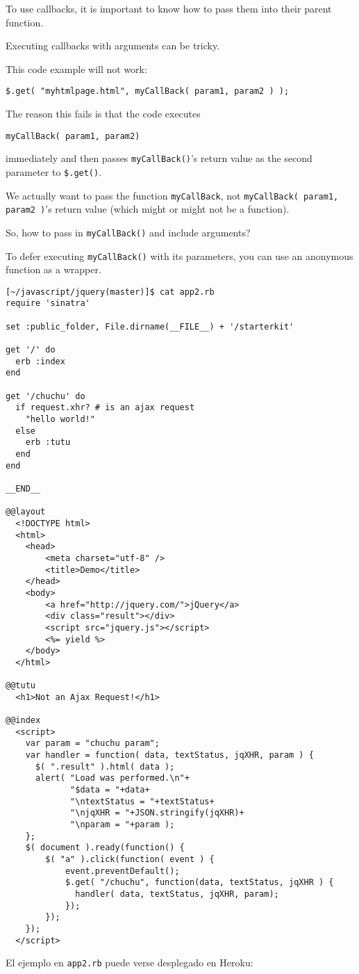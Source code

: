 To use callbacks, it is important to know how to pass them into their parent function.


Executing callbacks with arguments can be tricky.

This code example will not work:

\begin{verbatim}
$.get( "myhtmlpage.html", myCallBack( param1, param2 ) );
\end{verbatim}
The reason this fails is that the code executes 

\begin{verbatim}
myCallBack( param1, param2) 
\end{verbatim}

immediately and then passes \verb|myCallBack()|'s return value as the second
parameter to \verb|$.get()|. 

We actually want to pass the function \verb|myCallBack|,
not \verb|myCallBack( param1, param2 )|'s return value (which might or might not
be a function). 

So, how to pass in \verb|myCallBack()| and include arguments?

To defer executing \verb|myCallBack()| with its parameters, you can use
an anonymous function as a wrapper.


\begin{verbatim}
[~/javascript/jquery(master)]$ cat app2.rb
require 'sinatra'

set :public_folder, File.dirname(__FILE__) + '/starterkit'

get '/' do
  erb :index
end

get '/chuchu' do
  if request.xhr? # is an ajax request
    "hello world!"
  else 
    erb :tutu
  end
end

__END__

@@layout
  <!DOCTYPE html>
  <html>
    <head>
        <meta charset="utf-8" />
        <title>Demo</title>
    </head>
    <body>
        <a href="http://jquery.com/">jQuery</a>
        <div class="result"></div>
        <script src="jquery.js"></script>
        <%= yield %>
    </body>
  </html>

@@tutu
  <h1>Not an Ajax Request!</h1>

@@index
  <script>
    var param = "chuchu param";
    var handler = function( data, textStatus, jqXHR, param ) {
      $( ".result" ).html( data );
      alert( "Load was performed.\n"+
             "$data = "+data+
             "\ntextStatus = "+textStatus+
             "\njqXHR = "+JSON.stringify(jqXHR)+
             "\nparam = "+param );
    };
    $( document ).ready(function() {
        $( "a" ).click(function( event ) {
            event.preventDefault();
            $.get( "/chuchu", function(data, textStatus, jqXHR ) {
              handler( data, textStatus, jqXHR, param);
            });
        });
    });
  </script>
\end{verbatim}
El ejemplo en \verb|app2.rb| puede verse desplegado en Heroku:



